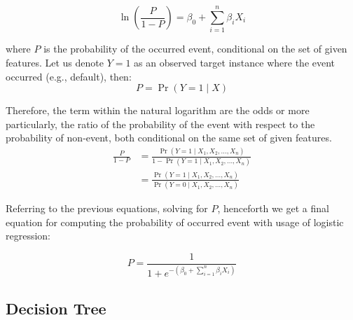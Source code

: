 \begin{equation}\label{eq}
    \ln\left(\frac{P}{1-P}\right) = \beta_0  + \sum_{i=1}^{n} \beta_i X_i
\end{equation}

where $P$ is the probability of the occurred event, conditional on the set of given features. Let us denote $Y=1$ as an observed target instance where the event occurred (e.g., default), then:
\begin{equation}\label{eq}
    P = \operatorname{Pr}(Y=1 \mid X)
\end{equation}

Therefore, the term within the natural logarithm are the odds or more particularly, the ratio of the probability of the event with respect to the probability of non-event, both conditional on the same set of given features.
\begin{equation}\label{eq}
    \begin{aligned}
    \frac{P}{1-P}  {} & = \frac{\operatorname{Pr}(Y=1 \mid X_1,X_2,\ldots,X_n)}{1-\operatorname{Pr}(Y=1 \mid X_1,X_2,\ldots,X_n)} \\
    & = \frac{\operatorname{Pr}(Y=1 \mid X_1,X_2,\ldots,X_n)}{\operatorname{Pr}(Y=0 \mid X_1,X_2,\ldots,X_n)}
\end{aligned}
    \end{equation}

Referring to the previous equations, solving for $P$, henceforth we get a final equation for computing the probability of occurred event with usage of logistic regression:

\begin{equation}\label{eq}
P = \frac{1}{1+e^{-\left(\beta_0 + \displaystyle\sum_{i=1}^{n} \beta_i X_i\right)}}
\end{equation}

\subsection{Decision Tree}
\label{subsec:dt}

